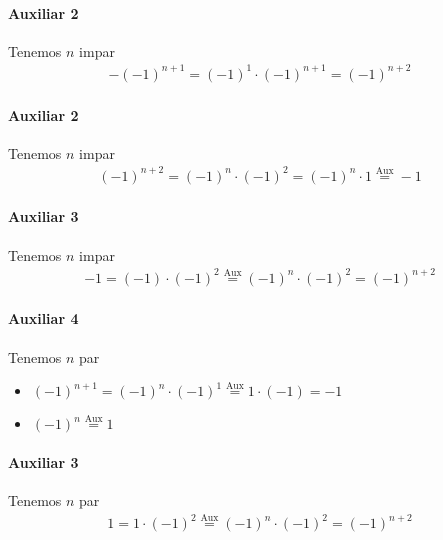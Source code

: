 \begin{enumerate}[label=\roman*)]
    \paragraph{Auxiliar 2}{
        Tenemos $n$ impar
        \begin{align*}
            -(-1)^{n+1} = (-1)^1 \cdot (-1)^{n+1} = (-1)^{n+2}
        \end{align*}
    }

    \paragraph{Auxiliar 2}{
        Tenemos $n$ impar
        \begin{align*}
            (-1)^{n+2} = (-1)^n \cdot (-1)^2 = (-1)^n \cdot 1 \overset{\text{Aux}}{=} -1
        \end{align*}
    }
    
    \paragraph{Auxiliar 3}{
        Tenemos $n$ impar
        \begin{align*}
            -1 = (-1) \cdot (-1)^2 \overset{\text{Aux}}{=} (-1)^n \cdot (-1)^2 = (-1)^{n+2}
        \end{align*}
    }

    \paragraph{Auxiliar 4}{
        Tenemos $n$ par
        \begin{itemize}
            \item $(-1)^{n+1} = (-1)^n \cdot (-1)^1 \overset{\text{Aux}}{=} 1 \cdot (-1) = -1$
            \item $(-1)^n \overset{\text{Aux}}{=} 1$
        \end{itemize}
    }

    \paragraph{Auxiliar 3}{
        Tenemos $n$ par
        \begin{align*}
            1 = 1 \cdot (-1)^2 \overset{\text{Aux}}{=} (-1)^n \cdot (-1)^2 = (-1)^{n+2}
        \end{align*}
    }
\end{enumerate}
